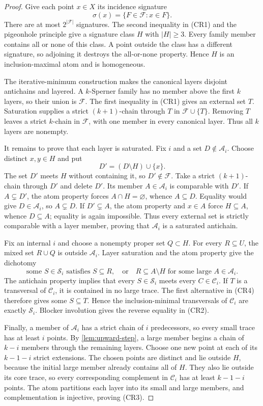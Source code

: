 \documentclass[11pt]{article}
\theoremstyle{definition}
\theoremstyle{remark}
\newcommand{\family}{\mathcal{F}}
\begin{document}
\begin{proof}
Give each point $x\in X$ its incidence signature
\[
  \sigma(x)=\{F\in\family:x\in F\}.
\]
There are at most $2^{|\family|}$ signatures.  The second inequality in
(CR1) and the pigeonhole principle give a signature class $H$ with
$|H|\geq3$.  Every family member contains all or none of this class.  A point
outside the class has a different signature, so adjoining it destroys the
all-or-none property.  Hence $H$ is an inclusion-maximal atom and is
homogeneous.

The iterative-minimum construction makes the canonical layers disjoint
antichains and layered.  A $k$-Sperner family has no member above the first
$k$ layers, so their union is $\family$.  The first inequality in (CR1) gives
an external set $T$.  Saturation supplies a strict $(k+1)$-chain through $T$
in $\family\cup\{T\}$.  Removing $T$ leaves a strict $k$-chain in $\family$,
with one member in every canonical layer.  Thus all $k$ layers are nonempty.

It remains to prove that each layer is saturated.  Fix $i$ and a set
$D\notin\mathcal A_i$.  Choose distinct $x,y\in H$ and put
\[
  D'=(D\setminus H)\cup\{x\}.
\]
The set $D'$ meets $H$ without containing it, so $D'\notin\family$.
Take a strict $(k+1)$-chain through $D'$ and delete $D'$.  Its member
$A\in\mathcal A_i$ is comparable with $D'$.  If $A\subsetneq D'$, the atom
property forces $A\cap H=\varnothing$, whence $A\subseteq D$.  Equality would
give $D\in\mathcal A_i$, so $A\subsetneq D$.  If $D'\subsetneq A$, the atom
property and $x\in A$ force $H\subseteq A$, whence $D\subseteq A$; equality
is again impossible.  Thus every external set is strictly comparable with a
layer member, proving that $\mathcal A_i$ is a saturated antichain.

Fix an internal $i$ and choose a nonempty proper set $Q\subset H$.  For every
$R\subseteq U$, the mixed set $R\cup Q$ is outside $\mathcal A_i$.
Layer saturation and the atom property give the dichotomy
\[
  \text{some }S\in\mathcal S_i\text{ satisfies }S\subseteq R,
  \quad\text{or}\quad
  R\subseteq A\setminus H\text{ for some large }A\in\mathcal A_i.
  \tag{CR4}
\]
The antichain property implies that every $S\in\mathcal S_i$ meets every
$C\in\mathcal C_i$.  If $T$ is a transversal of $\mathcal C_i$, it is
contained in no large trace.  The first alternative in (CR4) therefore gives
some $S\subseteq T$.  Hence the inclusion-minimal transversals of
$\mathcal C_i$ are exactly $\mathcal S_i$.  Blocker involution gives the
reverse equality in (CR2).

Finally, a member of $\mathcal A_i$ has a strict chain of $i$ predecessors,
so every small trace has at least $i$ points.  By
\cref{lem:upward-step}, a large member begins a chain of $k-i$ members through
the remaining layers.  Choose one new point at each of its $k-1-i$ strict
extensions.  The chosen points are distinct and lie outside $H$, because the
initial large member already contains all of $H$.  They also lie outside its
core trace, so every corresponding complement in $\mathcal C_i$ has at least
$k-1-i$ points.  The atom partitions each layer into its small and large
members, and complementation is injective, proving (CR3).
\end{proof}
\end{document}
